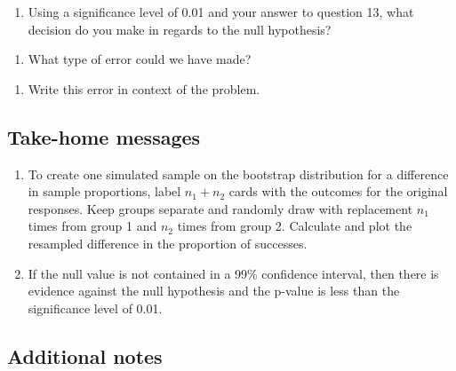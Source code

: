 \documentclass[
]{report}
\providecommand{\tightlist}{%
  \setlength{\itemsep}{0pt}\setlength{\parskip}{0pt}}
\begin{document}
\begin{enumerate}
\def\labelenumi{\arabic{enumi}.}
\setcounter{enumi}{13}
\tightlist
\item
  Using a significance level of 0.01 and your answer to question 13, what decision do you make in regards to the null hypothesis?
\end{enumerate}

\vspace{0.3in}

\begin{enumerate}
\def\labelenumi{\arabic{enumi}.}
\setcounter{enumi}{14}
\tightlist
\item
  What type of error could we have made?
\end{enumerate}

\vspace{0.3in}

\begin{enumerate}
\def\labelenumi{\arabic{enumi}.}
\setcounter{enumi}{15}
\tightlist
\item
  Write this error in context of the problem.
\end{enumerate}

\vspace{0.5in}

\newpage

\hypertarget{take-home-messages-14}{%
\subsection{Take-home messages}\label{take-home-messages-14}}

\begin{enumerate}
\def\labelenumi{\arabic{enumi}.}
\item
  To create one simulated sample on the bootstrap distribution for a difference in sample proportions, label \(n_1 + n_2\) cards with the outcomes for the original responses. Keep groups separate and randomly draw with replacement \(n_1\) times from group 1 and \(n_2\) times from group 2. Calculate and plot the resampled difference in the proportion of successes.
\item
  If the null value is not contained in a 99\% confidence interval, then there is evidence against the null hypothesis and the p-value is less than the significance level of 0.01.
\end{enumerate}

\hypertarget{additional-notes-13}{%
\subsection{Additional notes}\label{additional-notes-13}}
\end{document}
